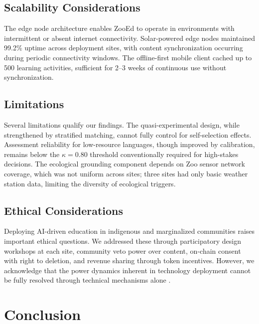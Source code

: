 \documentclass[11pt,a4paper]{article}
\begin{document}
\subsection{Scalability Considerations}

The edge node architecture enables ZooEd to operate in environments with intermittent or absent internet connectivity.
Solar-powered edge nodes maintained 99.2\% uptime across deployment sites, with content synchronization occurring during periodic connectivity windows.
The offline-first mobile client cached up to 500 learning activities, sufficient for 2--3 weeks of continuous use without synchronization.

\subsection{Limitations}

Several limitations qualify our findings.
The quasi-experimental design, while strengthened by stratified matching, cannot fully control for self-selection effects.
Assessment reliability for low-resource languages, though improved by calibration, remains below the $\kappa = 0.80$ threshold conventionally required for high-stakes decisions.
The ecological grounding component depends on Zoo sensor network coverage, which was not uniform across sites; three sites had only basic weather station data, limiting the diversity of ecological triggers.

\subsection{Ethical Considerations}

Deploying AI-driven education in indigenous and marginalized communities raises important ethical questions.
We addressed these through participatory design workshops at each site, community veto power over content, on-chain consent with right to deletion, and revenue sharing through token incentives.
However, we acknowledge that the power dynamics inherent in technology deployment cannot be fully resolved through technical mechanisms alone \citep{couldry2019data}.

\section{Conclusion}
\label{sec:conclusion}
\end{document}
